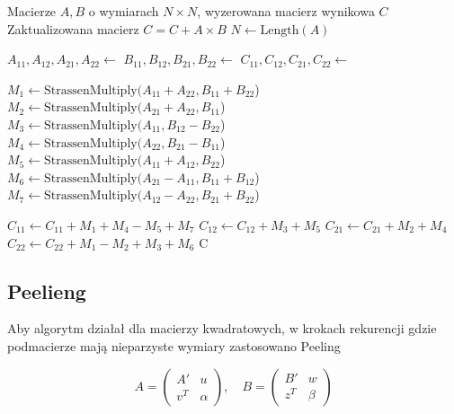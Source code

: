 \documentclass[twoside]{article}
\begin{document}
\begin{algorithm}[H]
\caption{Algorytm Strassena}
\label{alg:strassen}
\begin{algorithmic}[1]
\Require Macierze $A, B$ o wymiarach $N \times N$, wyzerowana macierz wynikowa $C$
\Ensure Zaktualizowana macierz $C = C + A \times B$
\State $N \gets \text{Length}(A)$
        \State \Return {}
    \EndIf
    
    \State $A_{11}, A_{12}, A_{21}, A_{22} \gets $
    \State $B_{11}, B_{12}, B_{21}, B_{22} \gets $
    \State $C_{11}, C_{12}, C_{21}, C_{22} \gets $
    

      \State $M_1 \gets \text{StrassenMultiply}(A_{11} + A_{22}, B_{11} + B_{22}$) \\
      \State $M_2 \gets \text{StrassenMultiply}(A_{21} + A_{22}, B_{11}$) \\
      \State $M_3 \gets \text{StrassenMultiply}(A_{11}, B_{12} - B_{22}$) \\
      \State $M_4 \gets \text{StrassenMultiply}(A_{22}, B_{21} - B_{11}$) \\
      \State $M_5 \gets \text{StrassenMultiply}(A_{11} + A_{12}, B_{22}$) \\
      \State $M_6 \gets \text{StrassenMultiply}(A_{21} - A_{11}, B_{11} + B_{12}$) \\
      \State $M_7 \gets \text{StrassenMultiply}(A_{12} - A_{22}, B_{21} + B_{22}$)
    

    
    \State $C_{11} \gets C_{11} + M_1 + M_4 - M_5 + M_7$
    \State $C_{12} \gets C_{12} + M_3 + M_5$
    \State $C_{21} \gets C_{21} + M_2 + M_4$
    \State $C_{22} \gets C_{22} + M_1 - M_2 + M_3 + M_6$
    \State \Return C
\EndFunction
\end{algorithmic}
\end{algorithm}


\subsection{Peelieng}
Aby algorytm działał dla macierzy kwadratowych, w krokach rekurencji gdzie podmacierze mają nieparzyste wymiary zastosowano Peeling

\begin{equation*}
A = \begin{pmatrix} A' & u \\ v^T & \alpha \end{pmatrix}, \quad 
B = \begin{pmatrix} B' & w \\ z^T & \beta \end{pmatrix}
\end{equation*}
\end{document}
